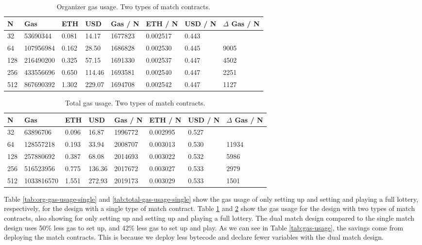 \begin{table}[h]
\centering
\caption{Organizer gas usage. Two types of match contracts.}
\label{tab:org-gas-usage-dual}
\begin{tabular}{|l|l|l|l|l|l|l|l|}
\hline

N & Gas & ETH & USD & Gas / N & ETH / N & USD / N & $\Delta$ Gas / N \\ \hline
32 & 53690344 & 0.081 & 14.17 & 1677823 & 0.002517 & 0.443 &  \\ \hline
64 & 107956984 & 0.162 & 28.50 & 1686828 & 0.002530 & 0.445 & 9005 \\ \hline
128 & 216490200 & 0.325 & 57.15 & 1691330 & 0.002537 & 0.447 & 4502 \\ \hline
256 & 433556696 & 0.650 & 114.46 & 1693581 & 0.002540 & 0.447 & 2251 \\ \hline
512 & 867690392 & 1.302 & 229.07 & 1694708 & 0.002542 & 0.447 & 1127 \\ \hline

\end{tabular}
\end{table}

\begin{table}[h]
\centering
\caption{Total gas usage. Two types of match contracts.}
\label{tab:total-gas-usage-dual}
\begin{tabular}{|l|l|l|l|l|l|l|l|}
\hline

N & Gas & ETH & USD & Gas / N & ETH / N & USD / N & $\Delta$ Gas / N \\ \hline
32 & 63896706 & 0.096 & 16.87 & 1996772 & 0.002995 & 0.527 &  \\ \hline
64 & 128557218 & 0.193 & 33.94 & 2008707 & 0.003013 & 0.530 & 11934 \\ \hline
128 & 257880692 & 0.387 & 68.08 & 2014693 & 0.003022 & 0.532 & 5986 \\ \hline
256 & 516523956 & 0.775 & 136.36 & 2017672 & 0.003027 & 0.533 & 2979 \\ \hline
512 & 1033816570 & 1.551 & 272.93 & 2019173 & 0.003029 & 0.533 & 1501 \\ \hline

\end{tabular}
\end{table}

\noindent
Table \ref{tab:org-gas-usage-single} and \ref{tab:total-gas-usage-single} show the gas usage of only setting up and setting and playing a full lottery, respectively, for the design with a single type of match contract. Table \ref{tab:org-gas-usage-dual} and \ref{tab:total-gas-usage-dual} show the gas usage for the design with two types of match contracts, also showing for only setting up and setting up and playing a full lottery.
The dual match design compared to the single match design uses 50\% less gas to set up, and 42\% less gas to set up and play. As we can see in Table \ref{tab:gas-usage}, the savings come from deploying the match contracts. This is because we deploy less bytecode and declare fewer variables with the dual match design.

